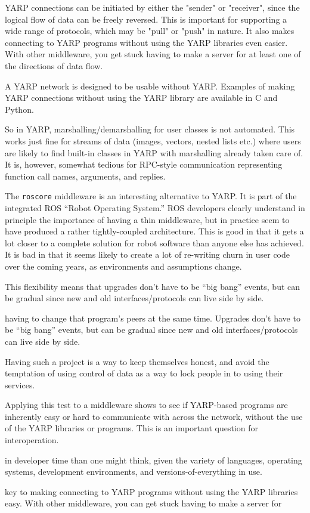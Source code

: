 YARP connections can be initiated by either the "sender" or
"receiver", since the logical flow of data can be freely reversed.
This is important for supporting a wide range of protocols, which may
be "pull" or "push" in nature.  It also makes connecting to YARP
programs without using the YARP libraries even easier.  With other
middleware, you get stuck having to make a server for at least one of
the directions of data flow.

A YARP network is designed to be usable without YARP.  Examples of
making YARP connections without using the YARP library are available
in C and Python.


So in YARP, marshalling/demarshalling for user classes
is not automated.  This works
just fine for streams of data (images, vectors, nested lists etc.)
where users are likely to find built-in classes in YARP with
marshalling already taken care of.  It is, however, somewhat tedious
for RPC-style communication representing function call names,
arguments, and replies.  

The {\tt roscore} middleware \cite{quigley2009ros} is an
interesting alternative to YARP.  
It is part of the integrated ROS ``Robot Operating
System.''  ROS developers clearly understand in principle the
importance of having a thin middleware, but in practice seem to have
produced a rather tightly-coupled architecture.  This is good in that
it gets a lot closer to a complete solution for robot software than
anyone else has achieved.  It is bad in that it seems likely to create
a lot of re-writing churn in user code over the coming years, as
environments and assumptions change.

This
flexibility means that upgrades don't have to be ``big bang''
events, but can be gradual since new and old interfaces/protocols can
live side by side.


 having to change that program's
peers at the same time.  Upgrades don't have to be ``big bang''
events, but can be gradual since new and old interfaces/protocols can
live side by side.

  Having such 
a project is a way to keep themselves honest, and avoid the 
temptation of using control of data as a way to lock people in to
using their services.

Applying this test to
a middleware shows
to see if YARP-based programs are inherently easy or hard to
communicate with across the network, without the use of the YARP
libraries or programs.  This is an important question for
interoperation.

 in
developer time than one might think, given the variety of languages,
operating systems, development environments, and
versions-of-everything in use.


key to making
connecting to YARP programs without using the YARP libraries easy.
With other middleware, you can get stuck having to make a server for
